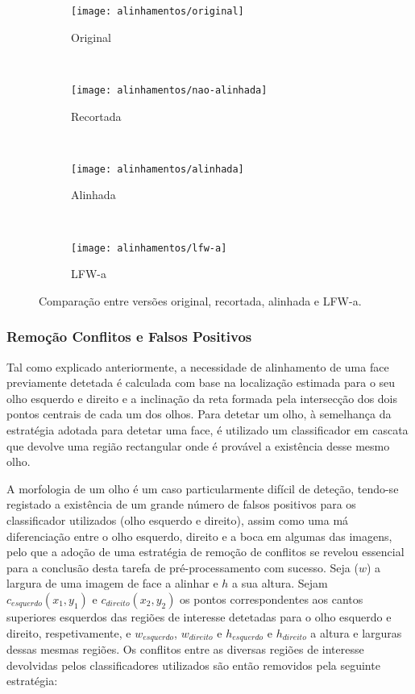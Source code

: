 \begin{figure}[t]
        \centering
        \begin{subfigure}[b]{0.2\textwidth}
                \centering
                \texttt{[image: alinhamentos/original]}
                \caption{Original}
                \label{fig:alinha_original}
        \end{subfigure}%
        ~ 
        \begin{subfigure}[b]{0.2\textwidth}
                \centering
                \texttt{[image: alinhamentos/nao-alinhada]}
                \caption{Recortada}
                \label{fig:alinha_nao-alinhada}
        \end{subfigure}
        ~ 
        \begin{subfigure}[b]{0.2\textwidth}
                \centering
                \texttt{[image: alinhamentos/alinhada]}
                \caption{Alinhada}
                \label{fig:alinha_alinhada}
        \end{subfigure}
        ~ 
        \begin{subfigure}[b]{0.2\textwidth}
                \centering
                \texttt{[image: alinhamentos/lfw-a]}
                \caption{LFW-a}
                \label{fig:alinha_lfw-a}
        \end{subfigure}
        \caption{Comparação entre versões original, recortada, alinhada e LFW-a.}\label{fig:alinhamentos}
\end{figure}

\subsubsection*{Remoção Conflitos e Falsos Positivos}
Tal como explicado anteriormente, a necessidade de alinhamento de uma face previamente detetada é calculada com base na localização estimada para o seu olho esquerdo e direito e a inclinação da reta formada pela intersecção dos dois pontos centrais de cada um dos olhos. Para detetar um olho, à semelhança da estratégia adotada para detetar uma face, é utilizado um classificador em cascata que devolve uma região rectangular onde é provável a existência desse mesmo olho. 

A morfologia de um olho é um caso particularmente difícil de deteção, tendo-se registado a existência de um grande número de falsos positivos para os classificador utilizados (olho esquerdo e direito), assim como uma má diferenciação entre o olho esquerdo, direito e a boca em algumas das imagens, pelo que a adoção de uma estratégia de remoção de conflitos se revelou essencial para a conclusão desta tarefa de pré-processamento com sucesso. Seja ($w$) a largura de uma imagem de face a alinhar e $h$ a sua altura. Sejam $c_{esquerdo}(x_1,y_1)$ e  $c_{direito}(x_2,y_2)$  os pontos correspondentes aos cantos superiores esquerdos das regiões de interesse detetadas para o olho esquerdo e direito, respetivamente, e $w_{esquerdo}$, $w_{direito}$ e $h_{esquerdo}$ e $h_{direito}$ a altura e larguras dessas mesmas regiões. Os conflitos entre as diversas regiões de interesse devolvidas pelos classificadores utilizados são então removidos pela seguinte estratégia:

